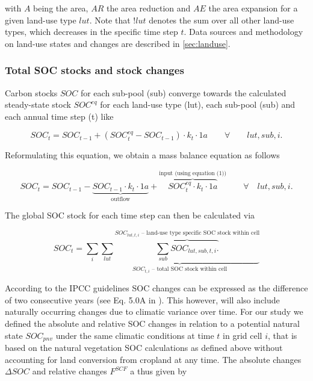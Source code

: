 \documentclass[gc, manuscript]{copernicus}
\begin{document}
with \(A\) being the area, \(AR\) the area reduction and \(AE\) the area expansion for a given land-use type \(lut\). Note that \(!lut\) denotes the sum over all other land-use types, which decreases in the specific time step \(t\). Data sources and methodology on land-use states and changes are described in \ref{sec:landuse}.

\hypertarget{total-soc-stocks-and-stock-changes}{%
\subsubsection{Total SOC stocks and stock changes}\label{total-soc-stocks-and-stock-changes}}

Carbon stocks \(SOC\) for each sub-pool (sub) converge towards the calculated steady-state stock \(SOC^{eq}\) for each land-use type (lut), each sub-pool (sub) and each annual time step (t) like

\begin{equation}
SOC_{t} = SOC_{t-1} + (SOC^{eq}_{t} - SOC_{t-1}) \cdot k_{t} \cdot 1\unit{a} \qquad \forall\quad\quad lut, sub, i.
\label{eq:SOCstate}
\end{equation}

Reformulating this equation, we obtain a mass balance equation as follows

\begin{equation}
SOC_{t} = SOC_{t-1} - \underbrace{SOC_{t-1} \cdot k_{t} \cdot 1\unit{a}}_{\text{outflow}} + \overbrace{SOC^{eq}_{t} \cdot k_{t} \cdot 1\unit{a}}^{\text{input (using equation (1))}}  \qquad \forall\quad lut, sub, i.
\label{eq:steadystate2budget}
\end{equation}

The global SOC stock for each time step can then be calculated via

\begin{equation}
SOC_{t} = \sum_{i} \underbrace{\sum_{lut} \overbrace{\sum_{sub} SOC_{lut, sub, t, i}.}^{\text{$SOC_{lut, t, i}$ -- land-use type specific SOC stock within cell}}}_{\text{$SOC_{t, i}$ -- total SOC stock within cell}}
\label{eq:totalstock}
\end{equation}

According to the IPCC guidelines SOC changes can be expressed as the difference of two consecutive years (see Eq. 5.0A in \citep{ipcc_2019_2019}). This however, will also include naturally occurring changes due to climatic variance over time. For our study we defined the absolute and relative SOC changes in relation to a potential natural state \(SOC_{pnv}\) under the same climatic conditions at time \(t\) in grid cell \(i\), that is based on the natural vegetation SOC calculations as defined above without accounting for land conversion from cropland at any time. The absolute changes \(\Delta SOC\) and relative changes \(F^{SCF}\) a thus given by
\end{document}
